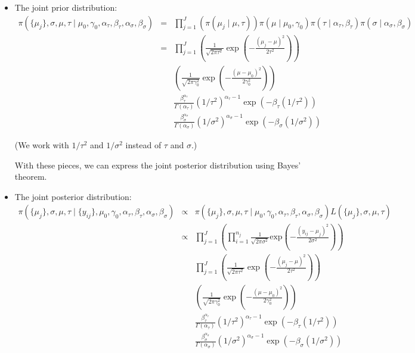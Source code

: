 \documentclass[11pt]{article}
\begin{document}
\begin{itemize}
\item The joint prior distribution:
\begin{eqnarray}
\pi(\{\mu_j\}, \sigma, \mu, \tau \mid \mu_0, \gamma_0, \alpha_{\tau}, \beta_{\tau}, \alpha_{\sigma}, \beta_{\sigma}) &=& \prod_{j=1}^{J}(\pi(\mu_j \mid \mu, \tau)) \pi(\mu \mid \mu_0, \gamma_0) \pi(\tau \mid \alpha_{\tau}, \beta_{\tau}) \pi(\sigma \mid \alpha_{\sigma}, \beta_{\sigma}) \nonumber \\
&=& \prod_{j=1}^{J} \left(\frac{1}{\sqrt{2\pi\tau^2}} \exp\left(-\frac{(\mu_j - \mu)^2}{2\tau^2}\right)\right) \nonumber \\
&& \left(\frac{1}{\sqrt{2\pi\gamma_0^2}}\exp\left(-\frac{(\mu - \mu_0)^2}{2\gamma_0^2}\right)\right) \nonumber \\
&& \frac{\beta_{\tau}^{\alpha_{\tau}}}{\Gamma(\alpha_{\tau})}(1/\tau^2)^{\alpha_{\tau} - 1}\exp(-\beta_{\tau}(1/\tau^2)) \nonumber \\
&& \frac{\beta_{\sigma}^{\alpha_{\sigma}}}{\Gamma(\alpha_{\sigma})}(1/\sigma^2)^{\alpha_{\sigma} - 1}\exp(-\beta_{\sigma}(1/\sigma^2))
\end{eqnarray}

(We work with $1/\tau^2$ and $1/\sigma^2$ instead of $\tau$ and $\sigma$.)

With these pieces, we can express the joint posterior distribution using Bayes' theorem.

\item The joint posterior distribution:
\begin{eqnarray}
\pi(\{\mu_j\}, \sigma, \mu, \tau \mid \{y_{ij}\}, \mu_0, \gamma_0, \alpha_{\tau}, \beta_{\tau}, \alpha_{\sigma}, \beta_{\sigma}) &\propto& \pi(\{\mu_j\}, \sigma, \mu, \tau \mid \mu_0, \gamma_0, \alpha_{\tau}, \beta_{\tau}, \alpha_{\sigma}, \beta_{\sigma}) L(\{\mu_j\}, \sigma, \mu, \tau) \nonumber \\
&\propto& \prod_{j=1}^{J}\left(\prod_{i=1}^{n_j} \frac{1}{\sqrt{2\pi\sigma^2}} \textrm{exp}\left(-\frac{(y_{ij} - \mu_j)^2}{2\sigma^2}\right)\right) \nonumber \\
&&\prod_{j=1}^{J} \left(\frac{1}{\sqrt{2\pi\tau^2}} \exp\left(-\frac{(\mu_j - \mu)^2}{2\tau^2}\right)\right) \nonumber \\
&& \left(\frac{1}{\sqrt{2\pi\gamma_0^2}}\exp\left(-\frac{(\mu - \mu_0)^2}{2\gamma_0^2}\right)\right) \nonumber \\
&& \frac{\beta_{\tau}^{\alpha_{\tau}}}{\Gamma(\alpha_{\tau})}(1/\tau^2)^{\alpha_{\tau} - 1}\exp(-\beta_{\tau}(1/\tau^2)) \nonumber \\
&& \frac{\beta_{\sigma}^{\alpha_{\sigma}}}{\Gamma(\alpha_{\sigma})}(1/\sigma^2)^{\alpha_{\sigma} - 1}\exp(-\beta_{\sigma}(1/\sigma^2))
\end{eqnarray}


\end{itemize}
\end{document}
